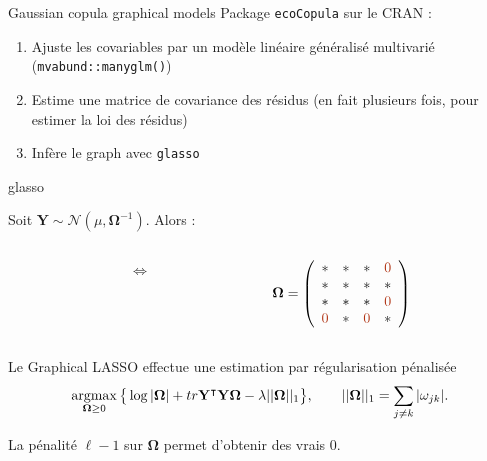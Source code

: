 \documentclass[11pt]{beamer}
\newcommand\Omegab{{\boldsymbol{\Omega}}}
\newcommand\Yb{{\bf Y}}
\newcommand{\Ybf}{{\boldsymbol{Y}}}
\newcommand{\edgeunit}{1.5}
\newcommand{\emphase}[1]{\textcolor{Complement}{#1}}
\newcommand{\argmax}{\mathop{\mathrm{argmax}}}
\begin{document}
\begin{frame}{Gaussian copula graphical models}
Package \texttt{ecoCopula} sur le CRAN :\\
\bigskip

\begin{enumerate}
\item Ajuste les covariables par un modèle linéaire généralisé multivarié (\texttt{mvabund::manyglm()})
\item Estime une matrice de covariance des résidus (en fait plusieurs fois, pour estimer la loi des résidus)
\item Infère le graph avec \texttt{glasso}
\end{enumerate}
\end{frame}
\begin{frame}{glasso}

  Soit $\Ybf\sim \mathcal{N}(\mu, \Omegab^{-1})$. Alors :
\vspace{0.3cm}
\begin{columns}
\begin{column}{0.4\linewidth}
\end{column}
\begin{column}{0.1\linewidth}
\emphase{$\iff$ }
\end{column}
\begin{column}{0.4\linewidth}
$\Omegab=\left(\begin{array}{llll}
*&*&*&\emphase{0}\\
*&*&*&*\\
*&*&*&\emphase{0}\\
\emphase{0}&*&\emphase{0}&*
\end{array}\right) $
\end{column}
\end{columns}
\bigskip

Le Graphical LASSO effectue une estimation par régularisation pénalisée
 $$\argmax_{\Omegab\geq 0} \big\{ \log |\Omegab| +tr{\Yb^\intercal \Yb \Omegab}- \lambda ||\Omegab||_1\big\}, \qquad ||\Omegab||_1 = \sum_{j\neq k} |\omega_{jk}|.$$
 
 La pénalité $\ell-1$ sur $\Omegab$ permet d'obtenir des vrais $0$.
\end{frame}
\end{document}
